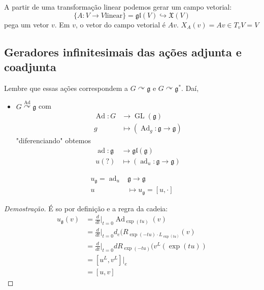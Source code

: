 \begin{example}
A partir de uma transformação linear podemos gerar um campo vetorial:
\[\{A:V\to V \text{linear} \} =\mathfrak{gl}(V) \hookrightarrow \mathfrak{X}(V)\]
pega um vetor $v$. Em $v$, o vetor do campo vetorial  é $Av$.
$X_A(v)=Av\in T_vV=V$

\subsection{Geradores infinitesimais das ações adjunta e coadjunta}

Lembre que essas ações correspondem a $G\curvearrowright \mathfrak{g}$ e $G\curvearrowright \mathfrak{g}^*$. Daí,
\begin{itemize}
\item $G\overset{\operatorname{Ad}}{\curvearrowright }\mathfrak{g}$ com
	\begin{align*}
		\operatorname{Ad}: G &\longrightarrow \operatorname{GL}(\mathfrak{g}) \\
		g &\longmapsto (\operatorname{Ad}_g:\mathfrak{g} \to \mathfrak{g} )
	\end{align*}
	"diferenciando" obtemos
	\begin{align*}
		\operatorname{ad}: \mathfrak{g} &\longrightarrow \mathfrak{gl}(\mathfrak{g}) \\
		u(?) &\longmapsto (\operatorname{ad}_u:\mathfrak{g} \to \mathfrak{g} )
	\end{align*}
	
\end{itemize}

\begin{lemma}
	 \begin{align*}
		u_\mathfrak{g} =\operatorname{ad}_u &\mathfrak{g}\longrightarrow \mathfrak{g} \\
		u &\longmapsto u_\mathfrak{g} =[u,\cdot ]
	\end{align*}
\end{lemma}

\begin{proof}[Demostração]
	É so por definição e a regra da cadeia:
	\begin{align*}
		u_{\mathfrak{g}}(v)&=\frac{d}{dt}\Big|_{t=0}\operatorname{Ad}_{\operatorname{exp}(tu)}(v)\\
		&=\frac{d}{dt}\Big|_{t=0}d_e(R_{\operatorname{exp}(-tu) \cdot L_{\operatorname{exp}(tu)}}(v)\\
		&=\frac{d}{dt}\Big|_{t=0}dR_{\operatorname{exp}(-tu)}(v^L(\operatorname{exp}(tu))\\
		&=[u^L,v^L]|_{e}\\
		&=[u,v]
	\end{align*}
\end{proof}
\end{example}

